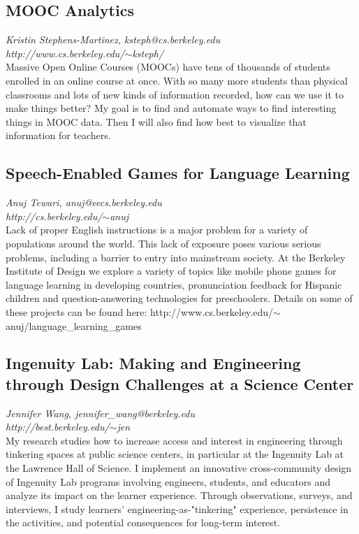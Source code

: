 \documentclass[foldmark,10pt,a4paper,notumble]{leaflet}
\begin{document}
\subsection{MOOC Analytics}
\emph{Kristin Stephens-Martinez, ksteph@cs.berkeley.edu}\\
\emph{http://www.cs.berkeley.edu/$\sim$ksteph/}\\
Massive Open Online Courses (MOOCs) have tens of thousands of students enrolled in an online course at once. With so many more students than physical classrooms and lots of new kinds of information recorded, how can we use it to make things better? My goal is to find and automate ways to find interesting things in MOOC data. Then I will also find how best to visualize that information for teachers.

\subsection{Speech-Enabled Games for Language Learning}
\emph{Anuj Tewari, anuj@eecs.berkeley.edu}\\
\emph{http://cs.berkeley.edu/$\sim$anuj}\\
Lack of proper English instructions is a major problem for a variety of populations around the world. This lack of exposure poses various serious problems, including a barrier to entry into mainstream society. At the Berkeley Institute of Design we explore a variety of topics like mobile phone games for language learning in developing countries, pronunciation feedback for Hispanic children and question-answering technologies for preschoolers. Details on some of these projects can be found here: http://www.cs.berkeley.edu/$\sim$anuj/language\_learning\_games

\subsection{Ingenuity Lab: Making and Engineering through Design Challenges at a Science Center}
\emph{Jennifer Wang, jennifer\_wang@berkeley.edu}\\
\emph{http://best.berkeley.edu/$\sim$jen}\\
My research studies how to increase access and interest in engineering through tinkering spaces at public science centers, in particular at the Ingenuity Lab at the Lawrence Hall of Science. I implement an innovative cross-community design of Ingenuity Lab programs involving engineers, students, and educators and analyze its impact on the learner experience. Through observations, surveys, and interviews, I study learners' engineering-as-"tinkering" experience, persistence in the activities, and potential consequences for long-term interest.
\end{document}
